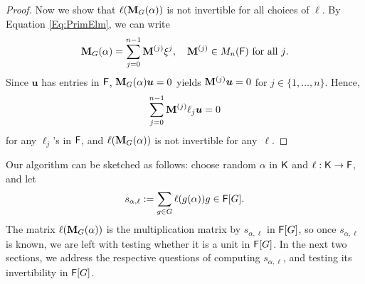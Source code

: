 \begin{proof}
  Now we show that $\ell(\mat M_G(\alpha))$ is not invertible for all
  choices of $\ell$. By Equation \eqref{Eq:PrimElm}, we can write
  $$\mat M_G(\alpha) = \sum_{j = 0}^{n-1} \mat M^{(j)} \xbar^j, \quad 
  \mat M^{(j)} \in M_{n}(\F) \text{~for all $j$}.$$ 
  Since $\boldsymbol{u}$ has entries in ${\mathsf{F}}$,
  $\mat M_G(\alpha) \boldsymbol{u} =0$ yields
  $\mat M^{(j)}\boldsymbol{u} = 0$ for
  $j \in \lbrace 1, \ldots , n \rbrace$. Hence,
$$\sum_{j = 0}^{n-1} \mat M^{(j)} \ell_j \boldsymbol{u} = 0$$ for any 
$\ell_j$'s in ${\mathsf{F}}$, and $\ell(\mat M_G(\alpha))$ is not invertible for any~$\ell$.
\end{proof} 
Our algorithm can be sketched as follows: choose random
$\alpha$ in ${\mathsf{K}}$ and $\ell: {\mathsf{K}}\to{\mathsf{F}}$, and let
\begin{equation}\label{def:s_alpha_ell}
s_{\alpha,\ell}:=\sum_{g \in G} \ell(g(\alpha))g \in {\mathsf{F}}[G].  
\end{equation}
 The
matrix $\ell(\mat M_G (\alpha))$ is the multiplication matrix by
$s_{\alpha,\ell}$ in ${\mathsf{F}}[G]$, so once $s_{\alpha,\ell}$ is known, we
are left with testing whether it is a unit in ${\mathsf{F}}[G]$.  In the next
two sections, we address the respective questions of computing
$s_{\alpha,\ell}$, and testing its invertibility in ${\mathsf{F}}[G]$.


